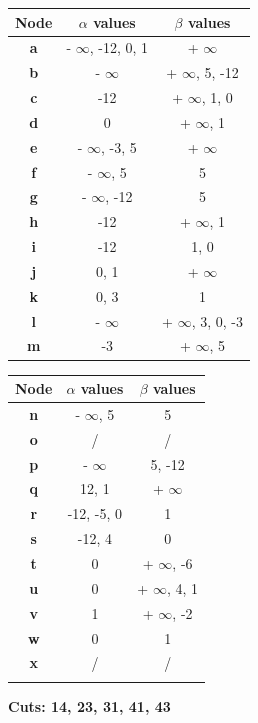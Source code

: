 \documentclass[11pt,a4paper]{report}
\begin{document}
\begin{answers}[8cm]
      \begin{multicols}{2}
      \begin{tabular}{ccc}
      Node & $\alpha$ values & $\beta$ values\\
      \hline
      \textbf{a} & - $\infty$, -12, 0, 1 &  + $\infty$ \\ 
      \textbf{b} & - $\infty$ & + $\infty$, 5, -12 \\
      \textbf{c} & -12 & + $\infty$, 1, 0 \\
      \textbf{d} & 0 & + $\infty$, 1 \\
      \textbf{e} & - $\infty$, -3, 5 & + $\infty$ \\
      \textbf{f} & - $\infty$, 5 & 5 \\
      \textbf{g} & - $\infty$, -12 & 5 \\
      \textbf{h} & -12 & + $\infty$, 1 \\
      \textbf{i} & -12 & 1, 0 \\
      \textbf{j} & 0, 1 & + $\infty$ \\
      \textbf{k} & 0, 3 & 1 \\
      \textbf{l} & - $\infty$ & + $\infty$, 3, 0, -3 \\
      \textbf{m} & -3 & + $\infty$, 5 \\ 
      \end{tabular}
      
      \begin{tabular}{ccc}
      Node & $\alpha$ values & $\beta$ values\\
      \hline
      \textbf{n} & - $\infty$, 5 & 5 \\
      \textbf{o} & / & / \\
      \textbf{p} & - $\infty$ & 5, -12 \\
      \textbf{q} & 12, 1 & + $\infty$ \\
      \textbf{r} & -12, -5, 0 & 1 \\
      \textbf{s} & -12, 4 & 0 \\
      \textbf{t} & 0 & + $\infty$, -6 \\
      \textbf{u} & 0 & + $\infty$, 4, 1 \\
      \textbf{v} & 1 & + $\infty$, -2 \\
      \textbf{w} & 0 & 1 \\
      \textbf{x} & / & / \\
       &  &  \\
      \end{tabular}
      \end{multicols}
      
\textbf{Cuts: 14, 23, 31, 41, 43}
\end{answers}
\end{document}
